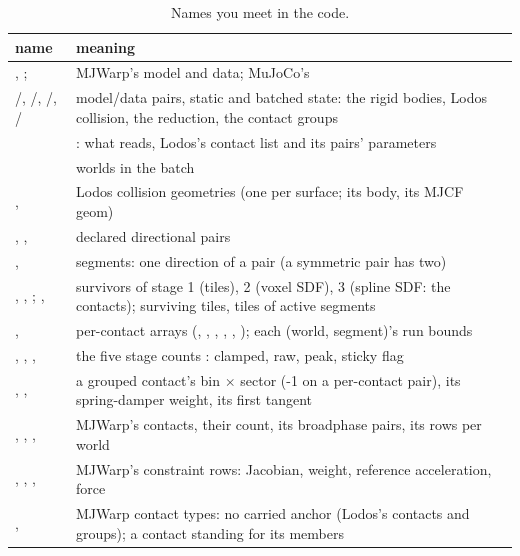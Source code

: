 \begin{table}[t]
\centering
\caption{Names you meet in the code.}
\label{tab:names}
\small
\begin{tabularx}{\linewidth}{@{}L{42mm}Y@{}}
\toprule
name & meaning \\
\midrule
{}, ;  & MJWarp's model and data; MuJoCo's  \\
/, /, /, / & model/data pairs,  static and  batched state: the rigid bodies, Lodos collision, the reduction, the contact groups \\
 & : what  reads, Lodos's contact list and its pairs' parameters \\
 & worlds in the batch \\
,  & Lodos collision geometries (one per surface;  its body,  its MJCF geom) \\
, ,  & declared directional pairs  \\
,  & segments: one direction of a pair (a symmetric pair has two) \\
, , ; ,  & survivors of stage 1 (tiles), 2 (voxel SDF), 3 (spline SDF: the contacts); surviving tiles, tiles of active segments \\
,  & per-contact arrays (, , , , , ); each (world, segment)'s run bounds \\
, , ,  & the five stage counts : clamped, raw, peak, sticky flag \\
, ,  & a grouped contact's bin $\times$ sector (-1 on a per-contact pair), its spring-damper weight, its first tangent \\
, , ,  & MJWarp's contacts, their count, its broadphase pairs, its rows per world \\
, , ,  & MJWarp's constraint rows: Jacobian, weight, reference acceleration, force \\
,  & MJWarp contact types: no carried anchor (Lodos's contacts and groups); a contact standing for its members \\
\bottomrule
\end{tabularx}
\end{table}

